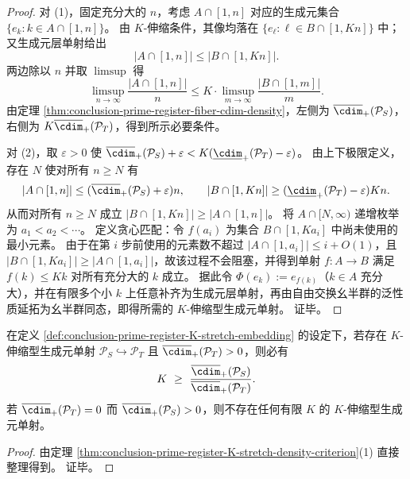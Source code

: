 \begin{proof}
对 (1)，固定充分大的 \(n\)，考虑 \(A\cap[1,n]\) 对应的生成元集合 \(\{e_k:k\in A\cap[1,n]\}\)。
由 \(K\)-伸缩条件，其像均落在 \(\{e_\ell:\ell\in B\cap[1,Kn]\}\) 中；又生成元层单射给出
\[
|A\cap[1,n]|\le |B\cap[1,Kn]|.
\]
两边除以 \(n\) 并取 \(\limsup\) 得
\[
\limsup_{n\to\infty}\frac{|A\cap[1,n]|}{n}
\le
K\cdot \limsup_{m\to\infty}\frac{|B\cap[1,m]|}{m}.
\]
由定理 \ref{thm:conclusion-prime-register-fiber-cdim-density}，左侧为 \(\overline{\cdim}_+(\mathcal P_S)\)，右侧为 \(K\overline{\cdim}_+(\mathcal P_T)\)，得到所示必要条件。

对 (2)，取 \(\varepsilon>0\) 使
\(
\overline{\cdim}_+(\mathcal P_S)+\varepsilon<K(\underline{\cdim}_+(\mathcal P_T)-\varepsilon)
\)。
由上下极限定义，存在 \(N\) 使对所有 \(n\ge N\) 有
\[
|A\cap[1,n]|\le (\overline{\cdim}_+(\mathcal P_S)+\varepsilon)n,
\qquad
|B\cap[1,Kn]|\ge (\underline{\cdim}_+(\mathcal P_T)-\varepsilon)Kn.
\]
从而对所有 \(n\ge N\) 成立 \(|B\cap[1,Kn]|\ge |A\cap[1,n]|\)。
将 \(A\cap[N,\infty)\) 递增枚举为 \(a_1<a_2<\cdots\)。
定义贪心匹配：令 \(f(a_i)\) 为集合 \(B\cap[1,Ka_i]\) 中尚未使用的最小元素。
由于在第 \(i\) 步前使用的元素数不超过 \(|A\cap[1,a_i]|\le i+O(1)\)，且 \(|B\cap[1,Ka_i]|\ge |A\cap[1,a_i]|\)，故该过程不会阻塞，并得到单射 \(f:A\to B\) 满足 \(f(k)\le Kk\) 对所有充分大的 \(k\) 成立。
据此令 \(\Phi(e_k):=e_{f(k)}\)（\(k\in A\) 充分大），并在有限多个小 \(k\) 上任意补齐为生成元层单射，再由自由交换幺半群的泛性质延拓为幺半群同态，即得所需的 \(K\)-伸缩型生成元单射。
证毕。
\end{proof}

\begin{corollary}[伸缩常数的刚性下界]\label{cor:conclusion-prime-register-K-stretch-rigidity-lb}
在定义 \ref{def:conclusion-prime-register-K-stretch-embedding} 的设定下，若存在 \(K\)-伸缩型生成元单射 \(\mathcal P_S\hookrightarrow \mathcal P_T\) 且 \(\overline{\cdim}_+(\mathcal P_T)>0\)，则必有
\[
K\ \ge\ \frac{\overline{\cdim}_+(\mathcal P_S)}{\overline{\cdim}_+(\mathcal P_T)}.
\]
若 \(\overline{\cdim}_+(\mathcal P_T)=0\) 而 \(\overline{\cdim}_+(\mathcal P_S)>0\)，则不存在任何有限 \(K\) 的 \(K\)-伸缩型生成元单射。
\end{corollary}

\begin{proof}
由定理 \ref{thm:conclusion-prime-register-K-stretch-density-criterion}(1) 直接整理得到。
证毕。
\end{proof}

